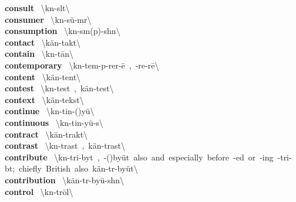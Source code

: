 \documentclass[10pt,a4paper]{article}
\begin{document}
\begin{multicols}{2}
\textbf{ consult }\quad \ \textbackslash k\textschwa n-\textprimstress s\textschwa lt\textbackslash \\
\textbf{ consumer }\quad \ \textbackslash k\textschwa n-\textprimstress s\"{u}-m\textschwa r\textbackslash \\
\textbf{ consumption }\quad \ \textbackslash k\textschwa n-\textprimstress s\textschwa m(p)-sh\textschwa n\textbackslash \\
\textbf{ contact }\quad \ \textbackslash \textprimstress k\"{a}n-\textsecstress takt\textbackslash \\
\textbf{ contain }\quad \ \textbackslash k\textschwa n-\textprimstress t\={a}n\textbackslash \\
\textbf{ contemporary }\quad \ \textbackslash k\textschwa n-\textprimstress tem-p\textschwa -\textsecstress rer-\={e}\ ,\ -\textsecstress re-r\={e}\textbackslash \\
\textbf{ content }\quad \ \textbackslash \textprimstress k\"{a}n-\textsecstress tent\textbackslash \\
\textbf{ contest }\quad \ \textbackslash k\textschwa n-\textprimstress test\ ,\ \textprimstress k\"{a}n-\textsecstress test\textbackslash \\
\textbf{ context }\quad \ \textbackslash \textprimstress k\"{a}n-\textsecstress tekst\textbackslash \\
\textbf{ continue }\quad \ \textbackslash k\textschwa n-\textprimstress tin-(\textsecstress )y\"{u}\textbackslash \\
\textbf{ continuous }\quad \ \textbackslash k\textschwa n-\textprimstress tin-y\"{u}-\textschwa s\textbackslash \\
\textbf{ contract }\quad \ \textbackslash \textprimstress k\"{a}n-\textsecstress trakt\textbackslash \\
\textbf{ contrast }\quad \ \textbackslash k\textschwa n-\textprimstress trast\ ,\ \textprimstress k\"{a}n-\textsecstress trast\textbackslash \\
\textbf{ contribute }\quad \ \textbackslash k\textschwa n-\textprimstress tri-by\textschwa t\ ,\ -(\textsecstress )by\"{u}t\ also\ and\ especially\ before\ -​ed\ or\ -​ing\ -\textprimstress tri-b\textschwa t;\ chiefly\ British\ also\ \textprimstress k\"{a}n-tr\textschwa -\textsecstress by\"{u}t\textbackslash \\
\textbf{ contribution }\quad \ \textbackslash \textsecstress k\"{a}n-tr\textschwa -\textprimstress by\"{u}-sh\textschwa n\textbackslash \\
\textbf{ control }\quad \ \textbackslash k\textschwa n-\textprimstress tr\={o}l\textbackslash \\

\end{multicols}
\end{document}
